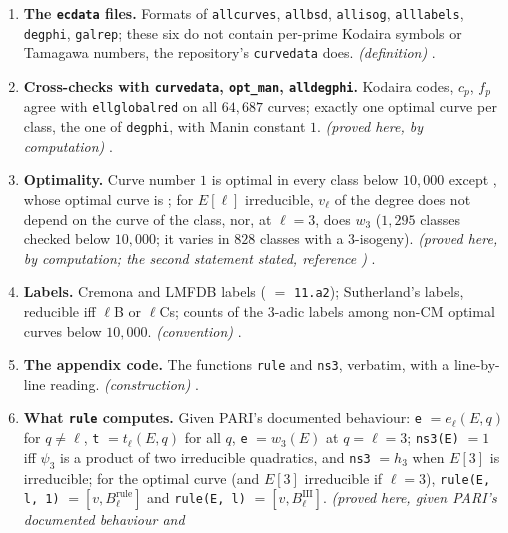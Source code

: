 \begin{enumerate}[label=\textbf{\thechapter.\arabic*}]
marks the optimal curve by the Smith invariants $[1,1]$ (, ); the largest degrees below $10{,}000$ need a stack of $16$ to $32$ MB. \emph{(stated;
reference \cite{PARIusers}; examples proved here, by computation)} .
\item \textbf{The \texttt{ecdata} files.} Formats of \texttt{allcurves}, \texttt{allbsd}, \texttt{allisog}, \texttt{alllabels}, \texttt{degphi}, \texttt{galrep}; these six do not contain
per-prime Kodaira symbols or Tamagawa numbers, the repository's \texttt{curvedata} does. \emph{(definition)} .
\item \textbf{Cross-checks with \texttt{curvedata}, \texttt{opt\_man}, \texttt{alldegphi}.} Kodaira codes, $c_p$, $f_p$ agree with \texttt{ellglobalred} on all $64{,}687$
curves; exactly one optimal curve per class, the one of \texttt{degphi}, with Manin constant $1$. \emph{(proved here, by computation)} .
\item \textbf{Optimality.} Curve number $1$ is optimal in every class below $10{,}000$ except , whose optimal curve is ; for $E[\ell]$ irreducible,
$v_\ell$ of the degree does not depend on the curve of the class, nor, at $\ell=3$, does $w_3$ ($1{,}295$ classes checked below $10{,}000$; it varies in $828$ classes with a $3$-isogeny).
\emph{(proved here, by computation; the second statement stated, reference )}
.
\item \textbf{Labels.} Cremona and LMFDB labels ( $=$ \texttt{11.a2}); Sutherland's labels, reducible iff $\ell$B or $\ell$Cs; counts of the $3$-adic labels
among non-CM optimal curves below $10{,}000$. \emph{(convention)} .
\item \textbf{The appendix code.} The functions \texttt{rule} and \texttt{ns3}, verbatim, with a line-by-line reading. \emph{(construction)}
.
\item \textbf{What \texttt{rule} computes.} Given PARI's documented behaviour: \texttt{e} $=e_\ell(E,q)$ for $q\ne\ell$, \texttt{t} $=t_\ell(E,q)$ for all $q$, \texttt{e} $=w_3(E)$ at $q=\ell=3$;
\texttt{ns3(E)} $=1$ iff $\psi_3$ is a product of two irreducible quadratics, and \texttt{ns3} $=h_3$ when $E[3]$ is irreducible; for the optimal curve (and $E[3]$
irreducible if $\ell=3$), \texttt{rule(E, l, 1)} $=[v,B^{\mathrm{rule}}_\ell]$ and \texttt{rule(E, l)} $=[v,B^{\mathrm{III}}_\ell]$. \emph{(proved here, given PARI's documented behaviour and
}
\end{enumerate}
